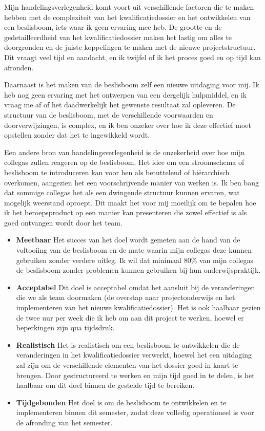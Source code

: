 Mijn handelingsverlegenheid komt voort uit verschillende factoren die te maken hebben met de complexiteit van het kwalificatiedossier en het ontwikkelen van een beslisboom, iets waar ik geen ervaring mee heb. De grootte en de gedetailleerdheid van het kwalificatiedossier maken het lastig om alles te doorgronden en de juiste koppelingen te maken met de nieuwe projectstructuur. Dit vraagt veel tijd en aandacht, en ik twijfel of ik het proces goed en op tijd kan afronden.


Daarnaast is het maken van de beslisboom zelf een nieuwe uitdaging voor mij. Ik heb nog geen ervaring met het ontwerpen van een dergelijk hulpmiddel, en ik vraag me af of het daadwerkelijk het gewenste resultaat zal opleveren. De structuur van de beslisboom, met de verschillende voorwaarden en doorverwijzingen, is complex, en ik ben onzeker over hoe ik deze effectief moet opstellen zonder dat het te ingewikkeld wordt.

Een andere bron van handelingsverlegenheid is de onzekerheid over hoe mijn collega\textquotesingle s
 zullen reageren op de beslisboom. Het idee om een stroomschema of beslisboom te introduceren kan voor hen als betuttelend of hiërarchisch overkomen, aangezien het een voorschrijvende manier van werken is. Ik ben bang dat sommige collega\textquotesingle s
 het als een dwingende structuur kunnen ervaren, wat mogelijk weerstand oproept. Dit maakt het voor mij moeilijk om te bepalen hoe ik het beroepsproduct op een manier kan presenteren die zowel effectief is als goed ontvangen wordt door het team.


\begin{itemize}
    \item \textbf {Meetbaar}
Het succes van het doel wordt gemeten aan de hand van de voltooiing van de beslisboom en de mate waarin mijn collega\textquotesingle s
 deze kunnen gebruiken zonder verdere uitleg. Ik wil dat minimaal 80\% van mijn collega\textquotesingle s
 de beslisboom zonder problemen kunnen gebruiken bij hun onderwijspraktijk.

    \item \textbf {Acceptabel}
Dit doel is acceptabel omdat het aansluit bij de veranderingen die we als team doormaken (de overstap naar projectonderwijs en het implementeren van het nieuwe kwalificatiedossier). Het is ook haalbaar gezien de twee uur per week die ik heb om aan dit project te werken, hoewel er beperkingen zijn qua tijdsdruk.

    \item  \textbf {Realistisch}
Het is realistisch om een beslisboom te ontwikkelen die de veranderingen in het kwalificatiedossier verwerkt, hoewel het een uitdaging zal zijn om de verschillende elementen van het dossier goed in kaart te brengen. Door gestructureerd te werken en mijn tijd goed in te delen, is het haalbaar om dit doel binnen de gestelde tijd te bereiken.

    \item \textbf {Tijdgebonden}
Het doel is om de beslisboom te ontwikkelen en te implementeren binnen dit semester, zodat deze volledig operationeel is voor de afronding van het semester.
    
\end{itemize}

